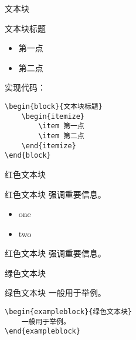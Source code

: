\documentclass[newPxFont,sthlmFooter]{beamer}
\begin{document}
\begin{frame}[containsverbatim]{文本块}

\begin{block}{文本块标题}
	\begin{itemize}
		\item 第一点
		\item 第二点
	\end{itemize}
\end{block}
实现代码：
\begin{verbatim}
\begin{block}{文本块标题}
    \begin{itemize}
		\item 第一点
		\item 第二点
    \end{itemize}
\end{block}
\end{verbatim}
\end{frame}


\begin{frame}[containsverbatim]{红色文本块}
\begin{alertblock}{红色文本块}
	强调重要信息。
\end{alertblock}
\begin{itemize}
    \item one
    \item two
\end{itemize}

\begin{sthlmLatex}
\begin{alertblock}{红色文本块}
强调重要信息。
\end{alertblock}
\end{sthlmLatex}
\end{frame}


\begin{frame}[containsverbatim]{绿色文本块}

\begin{exampleblock}{绿色文本块}
	一般用于举例。
\end{exampleblock}
\begin{verbatim}
\begin{exampleblock}{绿色文本块}
    一般用于举例。
\end{exampleblock}
\end{verbatim}
\end{frame}
\end{document}
